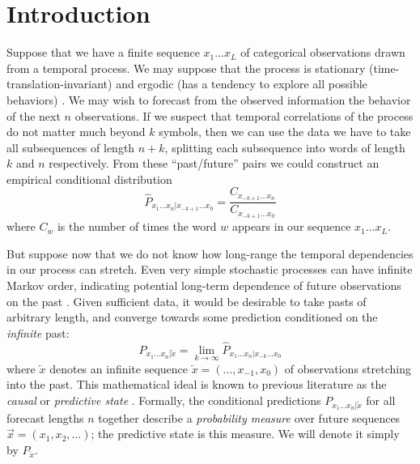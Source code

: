 \documentclass[sigconf, anonymous, review]{acmart}
\begin{document}


\maketitle

\section{Introduction}
Suppose that we have a finite sequence $x_1 \dots x_L$ of categorical
observations drawn from a temporal process. We may suppose that the process is
stationary (time-translation-invariant) and ergodic (has a tendency to explore
all possible behaviors) \cite{Kall01a,Shal07a}. We may wish to forecast from the
observed information the behavior of the next $n$ observations. If we suspect
that temporal correlations of the process do not matter much beyond $k$ symbols,
then we can use the data we have to take all subsequences of length $n+k$,
splitting each subsequence into words of length $k$ and $n$ respectively. From
these ``past/future'' pairs we could construct an empirical conditional
distribution
\begin{equation}\label{eq:conditional}
  \hat{P}_{x_{1}\dots x_{n}|x_{-k+1}\dots x_0} = 
  \frac{C_{x_{-k+1}\dots x_{n}}}{C_{x_{-k+1}\dots x_0}}
\end{equation}
where $C_{w}$ is the number of times the word $w$ appears in our sequence $x_1
\dots x_L$. 

But suppose now that we do not know how long-range the temporal dependencies in
our process can stretch. Even very simple stochastic processes can have infinite
Markov order, indicating potential long-term dependence of future observations
on the past \cite{Uppe97a}. Given sufficient data, it would be desirable to take
pasts of arbitrary length, and converge towards some prediction conditioned on
the \emph{infinite} past:
\begin{equation}\label{eq:convergence}
  {P}_{x_{1}\dots x_{n}|\overleftarrow{x}}
  = \lim_{k\rightarrow\infty}
  \hat{P}_{x_{1}\dots x_{n}|x_{-k}\dots x_0}
\end{equation}
where $\overleftarrow{x}$ denotes an infinite sequence $\overleftarrow{x} =
(\dots,x_{-1},x_0)$ of observations stretching into the past. This mathematical
ideal is known to previous literature as the \emph{causal} or \emph{predictive
state} \cite{Crut88a,Jaeg00a}. Formally, the conditional predictions
${P}_{x_{1}\dots x_{n}|\overleftarrow{x}}$ for all forecast lengths $n$ together
describe a \emph{probability measure} over future sequences $\overrightarrow{x}
= (x_1,x_2,\dots)$; the predictive state is this measure. We will denote it
simply by $P_{\overleftarrow{x}}$.
\end{document}

